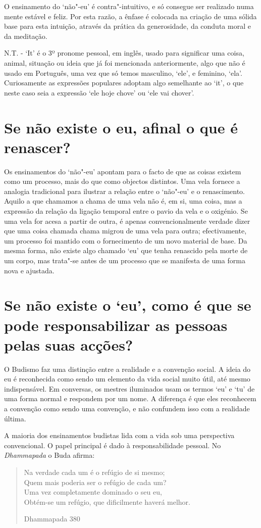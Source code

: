 O ensinamento do `não"-eu' é contra"-intuitivo, e só consegue ser
realizado numa mente estável e feliz. Por esta razão, a ênfase é
colocada na criação de uma sólida base para esta intuição, através da
prática da generosidade, da conduta moral e da meditação.

N.T. - `It' é o 3º pronome pessoal, em inglês, usado para significar uma
coisa, animal, situação ou ideia que já foi mencionada anteriormente,
algo que não é usado em Português, uma vez que só temos masculino,
`ele', e feminino, `ela'. Curiosamente as expressões populares adoptam
algo semelhante ao `it', o que neste caso seia a expressão `ele hoje
chove' ou `ele vai chover'.

\section{Se não existe o eu, afinal o que é renascer?}

Os ensinamentos do `não"-eu' apontam para o facto de que as coisas
existem como um processo, mais do que como objectos distintos. Uma vela
fornece a analogia tradicional para ilustrar a relação entre o
`não"-eu' e o renascimento. Aquilo a que chamamos a chama de uma vela
não é, em si, uma coisa, mas a expressão da relação da ligação temporal
entre o pavio da vela e o oxigénio. Se uma vela for acesa a partir de
outra, é apenas convencionalmente verdade dizer que uma coisa chamada
chama migrou de uma vela para outra; efectivamente, um processo foi
mantido com o fornecimento de um novo material de base. Da mesma forma,
não existe algo chamado `eu' que tenha renascido pela morte de um
corpo, mas trata"-se antes de um processo que se manifesta de uma forma
nova e ajustada.

\section{Se não existe o `eu', como é que se pode responsabilizar as pessoas
  pelas suas acções?}

O Budismo faz uma distinção entre a realidade e a convenção social. A
ideia do eu é reconhecida como sendo um elemento da vida social muito
útil, até mesmo indispensável. Em conversas, os mestres iluminados usam
os termos `eu' e `tu' de uma forma normal e respondem por um nome. A
diferença é que eles reconhecem a convenção como sendo uma convenção, e
não confundem isso com a realidade última.

A maioria dos ensinamentos budistas lida com a vida sob uma perspectiva
convencional. O papel principal é dado à responsabilidade pessoal. No
\emph{Dhammapada} o Buda afirma:

\begin{verse}
  Na verdade cada um é o refúgio de si mesmo;\\
  Quem mais poderia ser o refúgio de cada um?\\
  Uma vez completamente dominado o seu eu,\\
  Obtém-se um refúgio, que dificilmente haverá melhor.

  Dhammapada 380
\end{verse}
